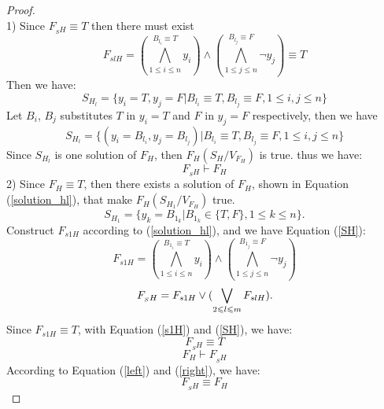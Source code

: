 \documentclass[conference]{IEEEtran}
\begin{document}
\begin{proof} \\
1) Since $F_{_SH} \equiv T$ then there must exist
\begin{equation}
F_{slH}=
(\bigwedge_{1\leqslant i\leqslant n}^{B_{l_i}\equiv T}y_{i})\wedge 
(\bigwedge_{1\leqslant j\leqslant n}^{B_{l_j}\equiv F}\neg y_{j}) \equiv T
\end{equation}
Then we have:
\begin{equation}
S_{H_l}=\{y_{i}=T,y_{j}=F|B_{l_i}\equiv T, B_{l_j}\equiv F, 1\leqslant i, j\leqslant n \} 
\end{equation}
Let $B_i$, $B_j$ substitutes $T$ in $y_{i}=T$ and $F$ in $y_{j}=F$ respectively, then we have
\begin{equation}
S_{H_l}=\{(y_i=B_{l_i},y_j=B_{l_j})|B_{l_i}\equiv T, B_{l_j}\equiv F, 1\leqslant i, j\leqslant n\} 
\end{equation}
Since $S_{H_l}$ is one solution of $F_H$, then  $F_H(S_H/V_{F_H}) $ is true. thus we have:
\begin{equation}\label{left}
 F_{_SH} \vdash F_H
\end{equation}
2) Since $F_H\equiv T$, then there exists a solution of $F_H$,
shown in Equation (\ref{solution_hl}), that make $F_H(S_{H_1}/V_{F_H})$ true.
\begin{equation}\label{solution_hl}
S_{H_1}=\{y_k=B_{1_k}|B_{1_k} \in \{T,F\}, 1\leqslant k\leqslant n\}.
\end{equation}
Construct $F_{s1H}$ according to (\ref{solution_hl}), and we have Equation (\ref{SH}):
\begin{equation}\label{s1H}
F_{s1H}=
(\bigwedge_{1\leqslant i\leqslant n}^{B_{1_i}\equiv T}y_{i})\wedge 
(\bigwedge_{1\leqslant j\leqslant n}^{B_{1_j}\equiv F}\neg y_{j})
\end{equation}
\begin{equation}\label{SH}
F_{_SH} =F_ {s1H} \vee (\bigvee_{2\leqslant l\leqslant m}F_{slH}). \\
\end{equation}
Since $F_{s1H} \equiv T$, with Equation (\ref{s1H}) and (\ref{SH}), we have: 
\begin{equation}
F_{_SH}  \equiv T 
\end{equation}
\begin{equation}\label{right}
F_H \vdash F_{_SH}
\end{equation}
According to Equation (\ref{left}) and (\ref{right}), we have:
\begin{equation}
 F_{_SH} \equiv F_H 
\end{equation}
\end{proof}
\end{document}
